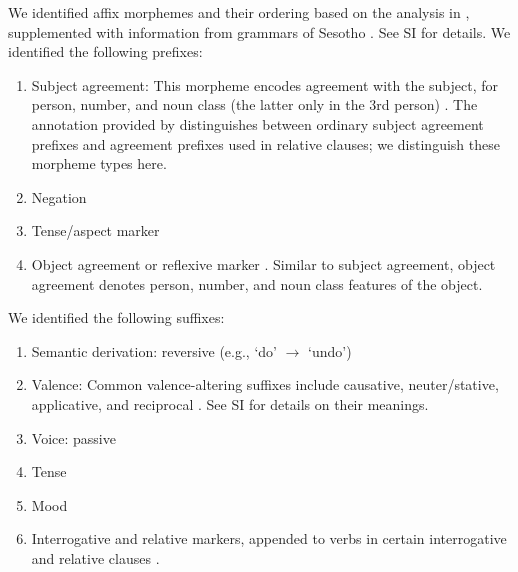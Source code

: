 We identified affix morphemes and their ordering based on the analysis in \cite{demuth1992acquisition}, supplemented with information from grammars of Sesotho \citep{doke1967textbook,guma1971outline}. See SI for details.
We identified the following prefixes:

\begin{enumerate}
    \item Subject agreement: This morpheme encodes agreement with the subject, for person, number, and noun class (the latter only in the 3rd person) \cite[]{doke1967textbook}.
	    The annotation provided by \cite{demuth1992acquisition} distinguishes between ordinary subject agreement prefixes and agreement prefixes used in relative clauses; we distinguish these morpheme types here.
    
    \item Negation \citep[]{doke1967textbook}
    
    \item Tense/aspect marker   \citep[--424]{doke1967textbook}
    
    \item Object agreement or reflexive marker \citep[]{doke1967textbook}. 
    Similar to subject agreement, object agreement denotes person, number, and noun class features of the object.
\end{enumerate}
We identified the following suffixes:

    
\begin{enumerate}
\item Semantic derivation: reversive (e.g., `do' $\rightarrow$ `undo') \citep[]{doke1967textbook}
\item Valence: Common valence-altering suffixes include causative, neuter/stative, applicative, and reciprocal \citep[--338]{doke1967textbook}. See SI for details on their meanings.
    \item Voice: passive \citep[]{doke1967textbook} 
    \item Tense \citep[]{doke1967textbook}
    \item Mood \citep[--445]{doke1967textbook}
    \item Interrogative and relative markers, appended to verbs in certain interrogative and relative clauses \citep[, 271, 320, 714, 793]{doke1967textbook}.
\end{enumerate}



